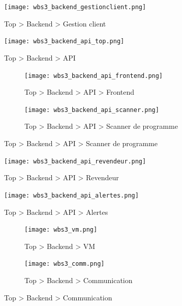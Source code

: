 \begin{figure}[H]
  \vspace*{2cm}
  \caption{Top \textgreater{} Backend \textgreater{} Gestion client}
  \centering
  \vspace*{0.5cm}
  \texttt{[image: wbs3\_backend\_gestionclient.png]}
\end{figure}


\begin{figure}[H]
  \vspace*{2cm}
  \caption{Top \textgreater{} Backend \textgreater{} API}
  \centering
  \vspace*{0.5cm}
  \texttt{[image: wbs3\_backend\_api\_top.png]}
\end{figure}

\begin{figure}[h]

  \begin{subfigure}{0.5\textwidth}
    \centering
    \caption{Top \textgreater{} Backend \textgreater{} API \textgreater{} Frontend}
    \texttt{[image: wbs3\_backend\_api\_frontend.png]}
  \end{subfigure}
  \begin{subfigure}{0.5\textwidth}
    \centering
    \caption{Top \textgreater{} Backend \textgreater{} API \textgreater{} Scanner de programme}
    \texttt{[image: wbs3\_backend\_api\_scanner.png]}
  \end{subfigure}

  \label{fig:image2}
\end{figure}


\begin{figure}[H]
  \vspace*{2cm}
  \caption{Top \textgreater{} Backend \textgreater{} API \textgreater{} Revendeur}
  \centering
  \vspace*{0.5cm}
  \texttt{[image: wbs3\_backend\_api\_revendeur.png]}
\end{figure}

\begin{figure}[H]
  \vspace*{2cm}
  \caption{Top \textgreater{} Backend \textgreater{} API \textgreater{} Alertes}
  \centering
  \vspace*{0.5cm}
  \texttt{[image: wbs3\_backend\_api\_alertes.png]}
\end{figure}


\begin{figure}[h]

  \begin{subfigure}{0.5\textwidth}
    \centering
    \caption{Top \textgreater{} Backend \textgreater{} VM}
    \texttt{[image: wbs3\_vm.png]}
  \end{subfigure}
  \begin{subfigure}{0.5\textwidth}
    \centering
    \caption{Top \textgreater{} Backend \textgreater{} Communication}
    \texttt{[image: wbs3\_comm.png]}
  \end{subfigure}

  \label{fig:image2}
\end{figure}

